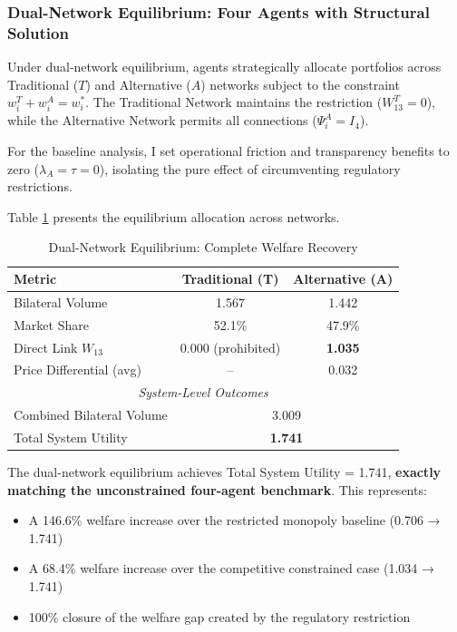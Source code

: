 \documentclass[12pt]{article}
\begin{document}
\subsubsection{Dual-Network Equilibrium: Four Agents with Structural Solution}

Under dual-network equilibrium, agents strategically allocate portfolios across Traditional ($T$) and Alternative ($A$) networks subject to the constraint $w_i^T + w_i^A = w_i^*$. The Traditional Network maintains the restriction ($W^T_{13} = 0$), while the Alternative Network permits all connections ($\Psi_i^A = I_4$).

For the baseline analysis, I set operational friction and transparency benefits to zero ($\lambda_A = \tau = 0$), isolating the pure effect of circumventing regulatory restrictions.

Table \ref{tab:dual_network_main} presents the equilibrium allocation across networks.

\begin{table}[h]
\centering
\caption{Dual-Network Equilibrium: Complete Welfare Recovery}
\label{tab:dual_network_main}
\begin{tabular}{lcc}
\toprule
\textbf{Metric} & \textbf{Traditional (T)} & \textbf{Alternative (A)} \\
\midrule
Bilateral Volume & 1.567 & 1.442 \\
Market Share & 52.1\% & 47.9\% \\
Direct Link $W_{13}$ & 0.000 (prohibited) & \textbf{1.035} \\
Price Differential (avg) & -- & 0.032 \\
\midrule
\multicolumn{3}{c}{\textit{System-Level Outcomes}} \\
\midrule
Combined Bilateral Volume & \multicolumn{2}{c}{3.009} \\
Total System Utility & \multicolumn{2}{c}{\textbf{1.741}} \\
\bottomrule
\end{tabular}
\end{table}

The dual-network equilibrium achieves Total System Utility = 1.741, \textbf{exactly matching the unconstrained four-agent benchmark}. This represents:
\begin{itemize}[noitemsep]
    \item A 146.6\% welfare increase over the restricted monopoly baseline (0.706 → 1.741)
    \item A 68.4\% welfare increase over the competitive constrained case (1.034 → 1.741)
    \item 100\% closure of the welfare gap created by the regulatory restriction
\end{itemize}
\end{document}
